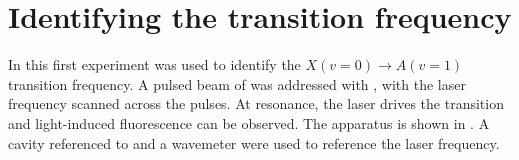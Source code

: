 \section{Identifying the transition frequency}

In this first experiment  was used to identify the $X(v=0)
\rightarrow A(v=1)$ transition frequency. A pulsed beam of \CaF{} was addressed
with , with the laser frequency scanned across the pulses. At
resonance, the laser drives the transition and light-induced fluorescence can
be observed. The apparatus is shown in . A cavity
referenced to  and a wavemeter were used to reference
the laser frequency.

\begin{figure}
  \centering
  \caption{}
  \label{exper:fig:beamapp}
\end{figure}


